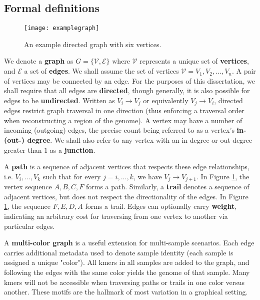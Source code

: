 \subsection{Formal definitions}

\begin{figure}[h!]
  \centering
    \texttt{[image: examplegraph]}
  \caption{An example directed graph with six vertices.}
  \label{fig:examplegraph}
\end{figure}

We denote a \textbf{graph} as $G = \{\mathcal{V}, \mathcal{E}\}$ where $\mathcal{V}$ represents a unique set of \textbf{vertices}, and $\mathcal{E}$ a set of \textbf{edges}\cite{Koller:2009ty}.  We shall assume the set of vertices $\mathcal{V} = V_1, V_2, ..., V_n$.  A pair of vertices may be connected by an edge.  For the purposes of this dissertation, we shall require that all edges are \textbf{directed}, though generally, it is also possible for edges to be \textbf{undirected}.  Written as $V_i \rightarrow V_j$ or equivalently $V_j \rightarrow V_i$, directed edges restrict graph traversal in one direction (thus enforcing a traversal order when reconstructing a region of the genome).  A vertex may have a number of incoming (outgoing) edges, the precise count being referred to as a vertex's \textbf{in- (out-) degree}.  We shall also refer to any vertex with an in-degree or out-degree greater than $1$ as a \textbf{junction}.

A \textbf{path} is a sequence of adjacent vertices that respects these edge relationships, i.e. $V_i, ..., V_k$ such that for every $j = i, ..., k$, we have $V_j \rightarrow V_{j+1}$.  In Figure \ref{fig:examplegraph}, the vertex sequence $A, B, C, F$ forms a path.  Similarly, a \textbf{trail} denotes a sequence of adjacent vertices, but does not respect the directionality of the edges.  In Figure \ref{fig:examplegraph}, the sequence $F, E, D, A$ forms a trail.  Edges can optionally carry \textbf{weight}, indicating an arbitrary cost for traversing from one vertex to another via particular edges.

A \textbf{multi-color graph} is a useful extension for multi-sample scenarios.  Each edge carries additional metadata used to denote sample identity (each sample is assigned a unique "color").  All kmers in all samples are added to the graph, and following the edges with the same color yields the genome of that sample.  Many kmers will not be accessible when traversing paths or trails in one color versus another.  These motifs are the hallmark of most variation in a graphical setting.

